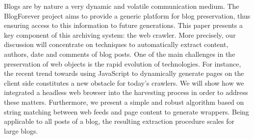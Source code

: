 Blogs are by nature a very dynamic and volatile communication medium. The
BlogForever project aims to provide a generic platform for blog preservation,
thus ensuring access to this information to future generations. This paper
presents a key component of this archiving system: the web crawler. More
precisely, our discussion will concentrate on techniques to automatically
extract content, authors, date and comments of blog posts. One of the main
challenges in the preservation of web objects is the rapid evolution of
technologies. For instance, the recent trend towards using JavaScript to
dynamically generate pages on the client side constitutes a new obstacle for
today's crawlers. We will show how we integrated a headless web browser into the
harvesting process in order to address these matters. Furthermore, we present a
simple and robust algorithm based on string matching between web feeds and page
content to generate wrappers. Being applicable to all posts of a blog, the
resulting extraction procedure scales for large blogs.
